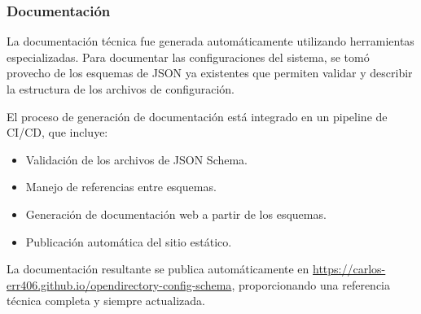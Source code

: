 \subsubsection{Documentación}

La documentación técnica fue generada automáticamente utilizando herramientas especializadas. Para documentar las configuraciones del sistema, se tomó provecho de los esquemas de JSON ya existentes que permiten validar y describir la estructura de los archivos de configuración.

El proceso de generación de documentación está integrado en un pipeline de CI/CD, que incluye:

\begin{itemize}
    \item Validación de los archivos de JSON Schema.
    \item Manejo de referencias entre esquemas.
    \item Generación de documentación web a partir de los esquemas.
    \item Publicación automática del sitio estático.
\end{itemize}

La documentación resultante se publica automáticamente en \url{https://carlos-err406.github.io/opendirectory-config-schema}, proporcionando una referencia técnica completa y siempre actualizada.
